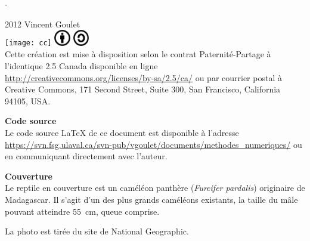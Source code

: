 

\cleardoublepage

\begin{adjustwidth*}{13.1mm}{-72mm}
  \sffamily
  \raggedright
  \vspace*{5mm}
  \thetitle \\
  \vspace*{3cm}
  \theauthor \\
  \vspace*{\fill}
  \thedate
\end{adjustwidth*}
\clearpage

\begingroup
\calccentering{\unitlength}
\begin{adjustwidth*}{\unitlength}{-\unitlength}
  \small
  \setlength{\parindent}{0pt}
  \setlength{\parskip}{\baselineskip}

  {\textcopyright} 2012 Vincent Goulet \\

  \texttt{[image: cc]}\;%
  \includegraphics[height=7mm,keepaspectratio=true]{by}\;%
  \includegraphics[height=7mm,keepaspectratio=true]{sa} \\
  Cette création est mise à disposition selon le contrat
  Paternité-Partage à l'identique 2.5 Canada disponible en ligne
  \url{http://creativecommons.org/licenses/by-sa/2.5/ca/} ou par
  courrier postal à Creative Commons, 171 Second Street, Suite 300,
  San Francisco, California 94105, USA.

  \textbf{Code source} \\
  Le code source {\LaTeX} de ce document est disponible à l'adresse
    \url{https://svn.fsg.ulaval.ca/svn-pub/vgoulet/documents/methodes_numeriques/}
  ou en communiquant directement avec l'auteur.

  \textbf{Couverture} \\
  Le reptile en couverture est un caméléon panthère (\emph{Furcifer
    pardalis}) originaire de Madagascar. Il s'agit d'un des plus
  grands caméléons existants, la taille du mâle pouvant atteindre
  55~cm, queue comprise.

  La photo est tirée du site de National Geographic.
\end{adjustwidth*}
\endgroup

\clearpage

